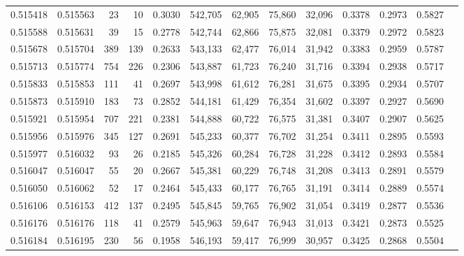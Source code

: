 \begin{tabular}{rrrrrrrrrrrrr}
0.515418 & 0.515563 &    23 &    10 &                                     0.3030 & 542,705 &  62,905 &  75,860 &  32,096 & 0.3378 & 0.2973 & 0.5827 \\
0.515588 & 0.515631 &    39 &    15 &                                     0.2778 & 542,744 &  62,866 &  75,875 &  32,081 & 0.3379 & 0.2972 & 0.5823 \\
0.515678 & 0.515704 &   389 &   139 &                                     0.2633 & 543,133 &  62,477 &  76,014 &  31,942 & 0.3383 & 0.2959 & 0.5787 \\
0.515713 & 0.515774 &   754 &   226 &                                     0.2306 & 543,887 &  61,723 &  76,240 &  31,716 & 0.3394 & 0.2938 & 0.5717 \\
0.515833 & 0.515853 &   111 &    41 &                                     0.2697 & 543,998 &  61,612 &  76,281 &  31,675 & 0.3395 & 0.2934 & 0.5707 \\
0.515873 & 0.515910 &   183 &    73 &                                     0.2852 & 544,181 &  61,429 &  76,354 &  31,602 & 0.3397 & 0.2927 & 0.5690 \\
0.515921 & 0.515954 &   707 &   221 &                                     0.2381 & 544,888 &  60,722 &  76,575 &  31,381 & 0.3407 & 0.2907 & 0.5625 \\
0.515956 & 0.515976 &   345 &   127 &                                     0.2691 & 545,233 &  60,377 &  76,702 &  31,254 & 0.3411 & 0.2895 & 0.5593 \\
0.515977 & 0.516032 &    93 &    26 &                                     0.2185 & 545,326 &  60,284 &  76,728 &  31,228 & 0.3412 & 0.2893 & 0.5584 \\
0.516047 & 0.516047 &    55 &    20 &                                     0.2667 & 545,381 &  60,229 &  76,748 &  31,208 & 0.3413 & 0.2891 & 0.5579 \\
0.516050 & 0.516062 &    52 &    17 &                                     0.2464 & 545,433 &  60,177 &  76,765 &  31,191 & 0.3414 & 0.2889 & 0.5574 \\
0.516106 & 0.516153 &   412 &   137 &                                     0.2495 & 545,845 &  59,765 &  76,902 &  31,054 & 0.3419 & 0.2877 & 0.5536 \\
0.516176 & 0.516176 &   118 &    41 &                                     0.2579 & 545,963 &  59,647 &  76,943 &  31,013 & 0.3421 & 0.2873 & 0.5525 \\
0.516184 & 0.516195 &   230 &    56 &                                     0.1958 & 546,193 &  59,417 &  76,999 &  30,957 & 0.3425 & 0.2868 & 0.5504 \\

\end{tabular}
